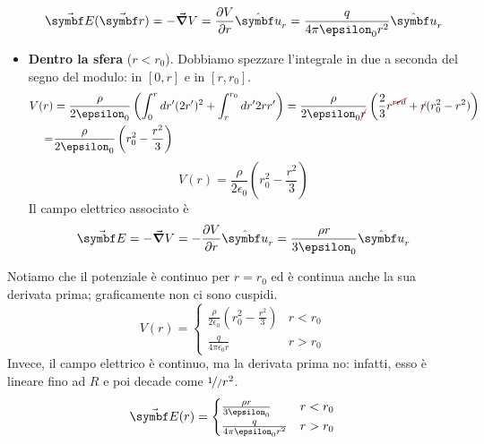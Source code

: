 \begin{examplewt}
\begin{itemize}
		\begin{equation}
			\vba{E}(\vba{r})=-\grad V=\pdv{V}{r}\vbh{u}_r =\frac{q}{4\pi\epsilon_0 r^2}\vbh{u}_r
		\end{equation}
		\item \textbf{Dentro la sfera} ($r<r_0$). Dobbiamo spezzare l'integrale in due a seconda del segno del modulo: in $\left[0,r\right]$ e in $\left[r, r_0\right]$.
		\begin{align*}
			V(r)&=\frac{\rho}{2\epsilon_0}\left( \int^r_0 dr'(2r')^2 + \int^{r_0}_r dr' 2rr' \right)= \frac{\rho}{2\epsilon_0 \Ccancel[red]{r}} \left( \frac{2}{3} r^{\Ccancel[red]{red}} + \Ccancel[red]{r} (r_0^2 -r^2) \right)\\
			=&\frac{\rho}{2\epsilon_0}\left( r_0^2 -\frac{r^2}{3} \right)
		\end{align*}
		\begin{equation}
			V(r)=\frac{\rho}{2\epsilon_0}\left( r_0^2 -\frac{r^2}{3} \right)
		\end{equation}
		Il campo elettrico associato è
		\begin{equation}
			\vba{E}=-\grad V= -\pdv{V}{r}\vbh{u}_r =\frac{\rho r}{3\epsilon_0}\vbh{u}_r
		\end{equation}
	\end{itemize}
	Notiamo che il potenziale è continuo per $r=r_0$ ed è continua anche la sua derivata prima; graficamente non ci sono cuspidi.
	\begin{equation*}
		V(r)=\begin{cases}
			\frac{\rho}{2\epsilon_0}(r_0^2 -\frac{r^2}{3}) & r<r_0\\
			\frac{q}{4\pi\epsilon_0 r} &r>r_0
		\end{cases}
	\end{equation*}
	Invece, il campo elettrico è continuo, ma la derivata prima no: infatti, esso è lineare fino ad $R$ e poi decade come $\nicefrac{1}/{r}^2$.
	\begin{equation*}
		\vba{E}(r)=\begin{cases}
			\frac{\rho r}{3\epsilon_0} & r<r_0\\
			\frac{q}{4\pi\epsilon_0 r^2} & r>r_0
		\end{cases}
	\end{equation*}
\end{examplewt}